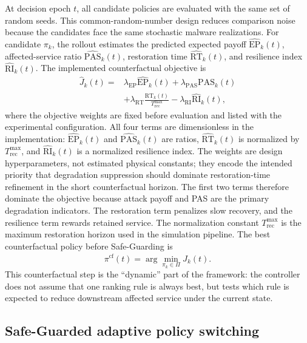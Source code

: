 \documentclass[lettersize,journal]{IEEEtran}
\begin{document}
At decision epoch $t$, all candidate policies are evaluated with the same set of random seeds. This common-random-number design reduces comparison noise because the candidates face the same stochastic malware realizations. For candidate $\pi_k$, the rollout estimates the predicted expected payoff $\widehat{\mathrm{EP}}_k(t)$, affected-service ratio $\widehat{\mathrm{PAS}}_k(t)$, restoration time $\widehat{\mathrm{RT}}_k(t)$, and resilience index $\widehat{\mathrm{RI}}_k(t)$. The implemented counterfactual objective is
\begin{equation}
\begin{aligned}
    \widehat{J}_k(t)
    =
    &\lambda_{\mathrm{EP}}\widehat{\mathrm{EP}}_k(t)
    +\lambda_{\mathrm{PAS}}\widehat{\mathrm{PAS}}_k(t) \\
    &+\lambda_{\mathrm{RT}}\frac{\widehat{\mathrm{RT}}_k(t)}{T_{\mathrm{rec}}^{\max}}
    -\lambda_{\mathrm{RI}}\widehat{\mathrm{RI}}_k(t),
\end{aligned}
    \label{eq:counterfactual_objective}
\end{equation}
where the objective weights are fixed before evaluation and listed with the experimental configuration. All four terms are dimensionless in the implementation: $\widehat{\mathrm{EP}}_k(t)$ and $\widehat{\mathrm{PAS}}_k(t)$ are ratios, $\widehat{\mathrm{RT}}_k(t)$ is normalized by $T_{\mathrm{rec}}^{\max}$, and $\widehat{\mathrm{RI}}_k(t)$ is a normalized resilience index. The weights are design hyperparameters, not estimated physical constants; they encode the intended priority that degradation suppression should dominate restoration-time refinement in the short counterfactual horizon. The first two terms therefore dominate the objective because attack payoff and PAS are the primary degradation indicators. The restoration term penalizes slow recovery, and the resilience term rewards retained service. The normalization constant $T_{\mathrm{rec}}^{\max}$ is the maximum restoration horizon used in the simulation pipeline. The best counterfactual policy before Safe-Guarding is
\begin{equation}
    \pi^{\mathrm{cf}}(t)
    =
    \arg\min_{\pi_k\in\Pi}
    \widehat{J}_k(t).
    \label{eq:cf_policy_selection}
\end{equation}
This counterfactual step is the ``dynamic'' part of the framework: the controller does not assume that one ranking rule is always best, but tests which rule is expected to reduce downstream affected service under the current state.

\subsection{Safe-Guarded adaptive policy switching}
\label{subsec:safeguard}
\end{document}

